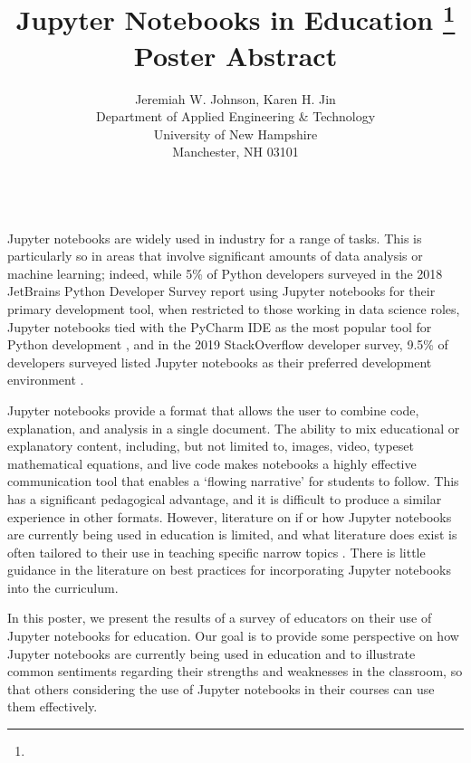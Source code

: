 \documentclass{article}
\title{Jupyter Notebooks in Education \footnote{\protect}\\
\vspace{0.2in}
\large Poster Abstract\\}
\author{
Jeremiah W. Johnson, Karen H. Jin\\
Department of Applied Engineering \& Technology \\
University of New Hampshire \\
Manchester, NH 03101 \\
\email{\{Jeremiah.Johnson, Karen.Jin\}@unh.edu}\\
}
\begin{document}
\maketitle

Jupyter notebooks are widely used in industry for a range of tasks.  This is particularly so in areas that involve significant amounts of data analysis or machine learning; indeed, while 5\% of Python developers surveyed in the 2018 JetBrains Python Developer Survey report using Jupyter notebooks for their primary development tool, when restricted to those working in data science roles, Jupyter notebooks tied with the PyCharm IDE as the most popular tool for Python development \cite{jetbrains2018dev}, and in the 2019 StackOverflow developer survey, 9.5\% of developers surveyed listed Jupyter notebooks as their preferred development environment \cite{stackoverflow2019dev}.  

Jupyter notebooks provide a format that allows the user to combine code, explanation, and analysis in a single document. The ability to mix educational or explanatory content, including, but not limited to, images, video, typeset mathematical equations, and live code makes notebooks a highly effective communication tool that enables a `flowing narrative' for students to follow. This has a significant pedagogical advantage, and it is difficult to produce a similar experience in other formats. However, literature on if or how Jupyter notebooks are currently being used in education is limited, and what literature does exist is often tailored to their use in teaching specific narrow topics \cite{DePratti:2019:UJN:3344051.3344077,Glick:2018:UJN:3280489.3280518}. There is little guidance in the literature on best practices for incorporating Jupyter notebooks into the curriculum.

In this poster, we present the results of a survey of educators on their use of Jupyter notebooks for education. Our goal is to provide some perspective on how Jupyter notebooks are currently being used in education and to illustrate common sentiments regarding their strengths and weaknesses in the classroom, so that others considering the use of Jupyter notebooks in their courses can use them effectively.


\small{

}
\end{document}

